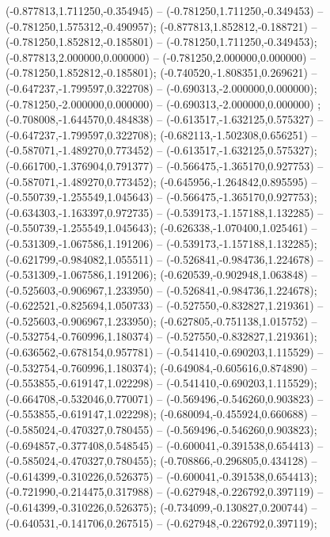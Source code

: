  (-0.877813,1.711250,-0.354945) -- (-0.781250,1.711250,-0.349453) -- (-0.781250,1.575312,-0.490957);
 (-0.877813,1.852812,-0.188721) -- (-0.781250,1.852812,-0.185801) -- (-0.781250,1.711250,-0.349453);
 (-0.877813,2.000000,0.000000) -- (-0.781250,2.000000,0.000000) -- (-0.781250,1.852812,-0.185801);
 (-0.740520,-1.808351,0.269621) -- (-0.647237,-1.799597,0.322708) -- (-0.690313,-2.000000,0.000000);
 (-0.781250,-2.000000,0.000000) -- (-0.690313,-2.000000,0.000000) ;
 (-0.708008,-1.644570,0.484838) -- (-0.613517,-1.632125,0.575327) -- (-0.647237,-1.799597,0.322708);
 (-0.682113,-1.502308,0.656251) -- (-0.587071,-1.489270,0.773452) -- (-0.613517,-1.632125,0.575327);
 (-0.661700,-1.376904,0.791377) -- (-0.566475,-1.365170,0.927753) -- (-0.587071,-1.489270,0.773452);
 (-0.645956,-1.264842,0.895595) -- (-0.550739,-1.255549,1.045643) -- (-0.566475,-1.365170,0.927753);
 (-0.634303,-1.163397,0.972735) -- (-0.539173,-1.157188,1.132285) -- (-0.550739,-1.255549,1.045643);
 (-0.626338,-1.070400,1.025461) -- (-0.531309,-1.067586,1.191206) -- (-0.539173,-1.157188,1.132285);
 (-0.621799,-0.984082,1.055511) -- (-0.526841,-0.984736,1.224678) -- (-0.531309,-1.067586,1.191206);
 (-0.620539,-0.902948,1.063848) -- (-0.525603,-0.906967,1.233950) -- (-0.526841,-0.984736,1.224678);
 (-0.622521,-0.825694,1.050733) -- (-0.527550,-0.832827,1.219361) -- (-0.525603,-0.906967,1.233950);
 (-0.627805,-0.751138,1.015752) -- (-0.532754,-0.760996,1.180374) -- (-0.527550,-0.832827,1.219361);
 (-0.636562,-0.678154,0.957781) -- (-0.541410,-0.690203,1.115529) -- (-0.532754,-0.760996,1.180374);
 (-0.649084,-0.605616,0.874890) -- (-0.553855,-0.619147,1.022298) -- (-0.541410,-0.690203,1.115529);
 (-0.664708,-0.532046,0.770071) -- (-0.569496,-0.546260,0.903823) -- (-0.553855,-0.619147,1.022298);
 (-0.680094,-0.455924,0.660688) -- (-0.585024,-0.470327,0.780455) -- (-0.569496,-0.546260,0.903823);
 (-0.694857,-0.377408,0.548545) -- (-0.600041,-0.391538,0.654413) -- (-0.585024,-0.470327,0.780455);
 (-0.708866,-0.296805,0.434128) -- (-0.614399,-0.310226,0.526375) -- (-0.600041,-0.391538,0.654413);
 (-0.721990,-0.214475,0.317988) -- (-0.627948,-0.226792,0.397119) -- (-0.614399,-0.310226,0.526375);
 (-0.734099,-0.130827,0.200744) -- (-0.640531,-0.141706,0.267515) -- (-0.627948,-0.226792,0.397119);
